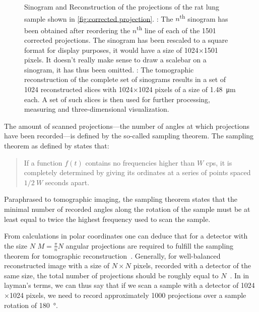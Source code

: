 \begin{figure}[htb]
{{%
			\label{subfig:rec}%
		}%
	}%
	\caption[Sinogram and Reconstruction]{Sinogram and Reconstruction of the projections of the rat lung sample shown in \autoref{fig:corrected projection}. : The $n$\textsuperscript{th} sinogram has been obtained after reordering the $n$\textsuperscript{th} line of each of the 1501 corrected projections. The sinogram has been rescaled to a square format for display purposes, it would have a size of 1024$\times$1501 pixels. It doesn't really make sense to draw a scalebar on a sinogram, it has thus been omitted. : The tomographic reconstruction of the complete set of sinograms results in a set of 1024 reconstructed slices with 1024$\times$1024 pixels of a size of \SI{1.48}{\micro\meter} each. A set of such slices is then used for further processing, measuring and three-dimensional visualization.}
	\label{fig:Sin Rec}
\end{figure}%

The amount of scanned projections---the number of angles at which projections have been recorded---is defined by the so-called sampling theorem. The sampling theorem as defined by \citet{Shannon1949} states that: \begin{quote}If a function $f(t)$ contains no frequencies higher than $W$ cps, it is completely determined by giving its ordinates at a series of points spaced $1/2\ W$ seconds apart. \cite{Shannon1949}\end{quote}

Paraphrased to tomographic imaging, the sampling theorem states that the minimal number of recorded angles along the rotation of the sample must be at least equal to twice the highest frequency used to scan the sample.

From calculations in polar coordinates one can deduce that for a detector with the size $N$ $M=\frac{\pi}{n}N$ angular projections are required to fulfill the sampling theorem for tomographic reconstruction~\cite{Stampanoni2002a}. Generally, for well-balanced reconstructed image with a size of $N\times N$ pixels, recorded with a detector of the same size, the total number of projections should be roughly equal to $N$~\cite{Kak2002}. In in layman's terms, we can thus say that if we scan a sample with a detector of 1024$\times$1024 pixels, we need to record approximately 1000 projections over a sample rotation of \SI{180}{\degree}.

